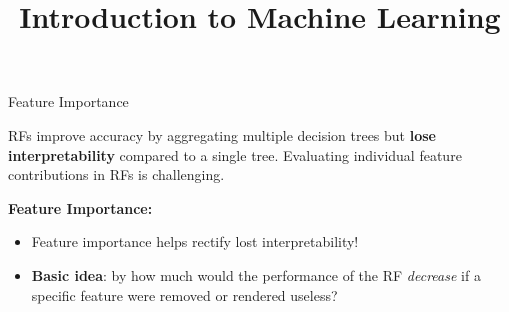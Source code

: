 \documentclass[11pt,compress,t,notes=noshow, xcolor=table]{beamer}
\title{Introduction to Machine Learning}
\begin{document}

\begin{vbframe}{Feature Importance}

RFs improve accuracy by aggregating multiple decision trees but \textbf{lose interpretability} compared to a single tree. Evaluating individual feature contributions in RFs is challenging.


\textbf{Feature Importance:}
\begin{itemize}
\item Feature importance helps rectify lost interpretability!
\item \textbf{Basic idea}: by how much would the performance of the RF \textit{decrease} if a specific feature were removed or rendered useless?
\end{itemize}

\end{vbframe}
\end{document}
